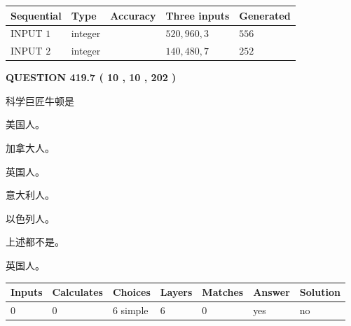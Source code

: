 \documentclass{ctexart}
\begin{document}
   
  
  
\noindent\begin{tabular}{|l|l|l|l|l|}
\hline
 Sequential & Type & Accuracy & Three inputs & Generated \\ 
\hline
 
 
  INPUT $  1 $ & integer &  & $
 520
 , 
 960
 , 
 3
 $ & $ 556 $ 
 \\  \hline  
 
 
  INPUT $  2 $ & integer &  & $
 140
 , 
 480
 , 
 7
 $ & $ 252 $ 
 \\  \hline  
 \end{tabular}
   
   
  
\vspace{0.2in}
  
{\textbf{\Large{QUESTION
419.7 
 ( 10 , 10 , 202 )
}}}
  
  
科学巨匠牛顿是
 
 
美国人。
 
 
加拿大人。
 
 
英国人。
 
 
意大利人。
 
 
以色列人。
 
 
 上述都不是。
 
 
\noindent{}
 
 
英国人。
 
 
\noindent{}
 
 
   
   
   
   
\noindent\begin{tabular}{|l|l|l|l|l|l|l|}
 \hline
Inputs & Calculates & Choices & Layers & Matches & Answer & Solution \\ \hline
 0  & 
 0  & 
 6
  simple  
  & 
 6  & 
 0  & 
  yes & 
  no 
  \\ \hline
 \end{tabular}
   
   
   
   
\noindent{}
   
\end{document}
